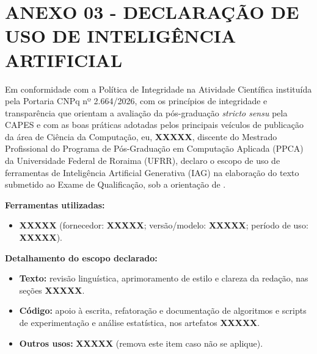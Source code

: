 \newpage
\section*{ANEXO 03 - DECLARAÇÃO DE USO DE INTELIGÊNCIA ARTIFICIAL}
\label{sec:anexo-3}

\vspace*{1cm}

Em conformidade com a Política de Integridade na Atividade Científica instituída pela Portaria CNPq nº 2.664/2026, com os princípios de integridade e transparência que orientam a avaliação da pós-graduação \textit{stricto sensu} pela CAPES e com as boas práticas adotadas pelos principais veículos de publicação da área de Ciência da Computação, eu, \textbf{XXXXX}, discente do Mestrado Profissional do Programa de Pós-Graduação em Computação Aplicada (PPCA) da Universidade Federal de Roraima (UFRR), declaro o escopo de uso de ferramentas de Inteligência Artificial Generativa (IAG) na elaboração do texto submetido ao Exame de Qualificação, sob a orientação de \getorientador.

\vspace{0.3cm}
\noindent\textbf{Ferramentas utilizadas:}
\begin{itemize}
    \item \textbf{XXXXX} (fornecedor: \textbf{XXXXX}; versão/modelo: \textbf{XXXXX}; período de uso: \textbf{XXXXX}).
\end{itemize}

\noindent\textbf{Detalhamento do escopo declarado:}
\begin{itemize}
    \item \textbf{Texto:} revisão linguística, aprimoramento de estilo e clareza da redação, nas seções \textbf{XXXXX}.
    \item \textbf{Código:} apoio à escrita, refatoração e documentação de algoritmos e scripts de experimentação e análise estatística, nos artefatos \textbf{XXXXX}.
    \item \textbf{Outros usos:} \textbf{XXXXX} (remova este item caso não se aplique).
\end{itemize}

